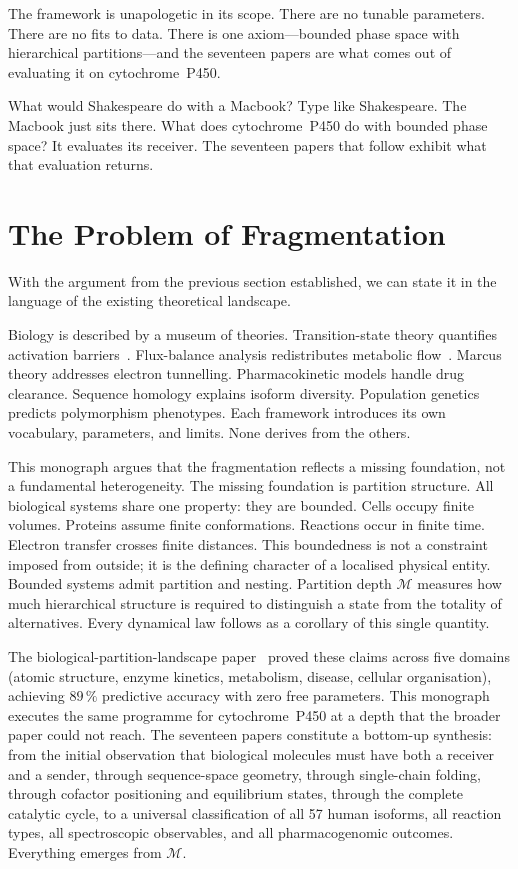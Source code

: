 \documentclass[11pt,twocolumn,a4paper]{article}
\theoremstyle{definition}
\theoremstyle{remark}
\newcommand{\Depth}{\mathcal{M}}
\begin{document}
The framework is unapologetic in its scope.  There are no tunable parameters.
There are no fits to data.  There is one axiom---bounded phase space with
hierarchical partitions---and the seventeen papers are what comes out of
evaluating it on cytochrome~P450.

What would Shakespeare do with a Macbook?  Type like Shakespeare.  The Macbook
just sits there.  What does cytochrome~P450 do with bounded phase space?  It
evaluates its receiver.  The seventeen papers that follow exhibit what that
evaluation returns.

\section{The Problem of Fragmentation}
\label{sec:problem}

With the argument from the previous section established, we can state it in
the language of the existing theoretical landscape.

Biology is described by a museum of theories.  Transition-state theory
quantifies activation barriers~\citep{eyring1935}.  Flux-balance analysis
redistributes metabolic flow~\citep{orth2010}.  Marcus theory addresses
electron tunnelling.  Pharmacokinetic models handle drug clearance.  Sequence
homology explains isoform diversity.  Population genetics predicts polymorphism
phenotypes.  Each framework introduces its own vocabulary, parameters, and
limits.  None derives from the others.

This monograph argues that the fragmentation reflects a missing foundation,
not a fundamental heterogeneity.  The missing foundation is partition structure.
All biological systems share one property: they are bounded.  Cells occupy
finite volumes.  Proteins assume finite conformations.  Reactions occur in
finite time.  Electron transfer crosses finite distances.  This boundedness is
not a constraint imposed from outside; it is the defining character of a
localised physical entity.  Bounded systems admit partition and nesting.
Partition depth $\Depth$ measures how much hierarchical structure is required to
distinguish a state from the totality of alternatives.  Every dynamical law
follows as a corollary of this single quantity.

The biological-partition-landscape paper~\citep{sachikonye2025_bpl} proved these
claims across five domains (atomic structure, enzyme kinetics, metabolism,
disease, cellular organisation), achieving $89\,\%$ predictive accuracy with
zero free parameters.  This monograph executes the same programme for
cytochrome~P450 at a depth that the broader paper could not reach.  The
seventeen papers constitute a bottom-up synthesis: from the initial observation
that biological molecules must have both a receiver and a sender, through
sequence-space geometry, through single-chain folding, through cofactor
positioning and equilibrium states, through the complete catalytic cycle, to a
universal classification of all 57 human isoforms, all reaction types, all
spectroscopic observables, and all pharmacogenomic outcomes.  Everything emerges
from $\Depth$.
\end{document}
